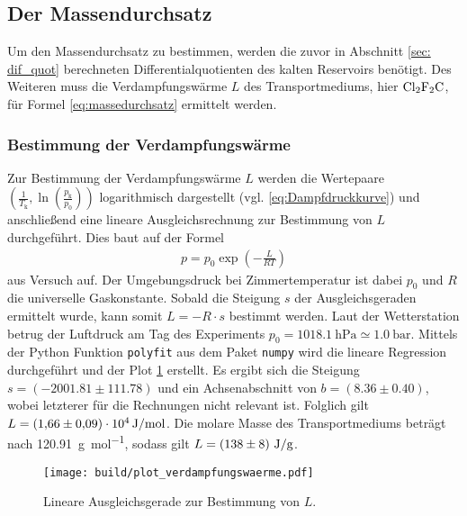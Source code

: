 \subsection{Der Massendurchsatz}
Um den Massendurchsatz zu bestimmen, werden die zuvor in Abschnitt \ref{sec: dif_quot}
berechneten Differentialquotienten des kalten Reservoirs benötigt.
Des Weiteren muss die Verdampfungswärme $L$ des Transportmediums, hier $\ce{Cl2F2C}$, für Formel \eqref{eq:massedurchsatz} ermittelt werden.


\subsubsection{Bestimmung der Verdampfungswärme}
Zur Bestimmung der Verdampfungswärme $L$ werden die Wertepaare $\left(\frac{1}{T_{\text{k}}}, \ln{\left(\frac{p_{\text{k}}}{p_0}\right)}\right)$ logarithmisch dargestellt (vgl. \eqref{eq:Dampfdruckkurve})
und anschließend eine lineare Ausgleichsrechnung zur Bestimmung von $L$ durchgeführt.
Dies baut auf der Formel 
\begin{align*}
    p = p_0 \exp{\left(-\frac{L}{RT}\right)}
\end{align*}
aus Versuch \cite[]{man:v203} auf.
Der Umgebungsdruck bei Zimmertemperatur ist dabei $p_0$ und $R$ die universelle Gaskonstante.
Sobald die Steigung $s$ der Ausgleichsgeraden ermittelt wurde, kann somit $L = -R \cdot s$ bestimmt werden.
Laut der Wetterstation \cite*[][]{wetterstation} betrug der Luftdruck am Tag des Experiments
$p_0 = \qty[]{1018.1}{\hecto\pascal} \simeq \qty[]{1.0}{\bar}$.
Mittels der Python \cite[]{python} Funktion \texttt{polyfit} aus dem Paket \texttt{numpy} \cite[]{numpy} wird die lineare Regression durchgeführt und
der Plot \ref{fig:ausgleichsgerade} erstellt.
Es ergibt sich die Steigung $s = \left(\num[]{-2001.81}\pm \num[]{111.78} \right)$ und ein Achsenabschnitt von 
$b = \left( \num[]{8.36} \pm \num[]{0.40} \right)$, 
wobei letzterer für die Rechnungen nicht relevant ist. 
Folglich gilt $L = \left(\num[]{1.66 \pm 0.09} \right) \cdot 10^{4} \, \unit[]{\joule\per\mol}$. 
Die molare Masse des Transportmediums beträgt nach \cite[]{gestis} \qty[]{120.91}{\gram\per\mol}, sodass gilt
$L = \left(\num[]{138 \pm 8} \right) \, \unit[]{\joule\per\gram}$.

\begin{figure}[H]
    \texttt{[image: build/plot\_verdampfungswaerme.pdf]}
    \caption[]{Lineare Ausgleichsgerade zur Bestimmung von $L$.}
    \label{fig:ausgleichsgerade}
\end{figure}

